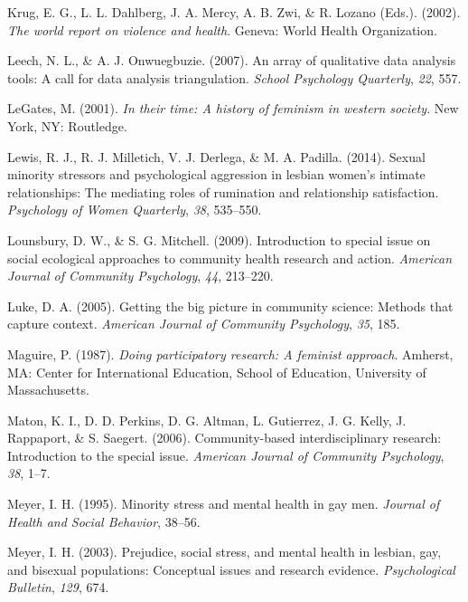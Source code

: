 \documentclass[11pt,]{tufte-book}
\begin{document}
\hypertarget{ref-krug2002world}{}
Krug, E. G., L. L. Dahlberg, J. A. Mercy, A. B. Zwi, \& R. Lozano
(Eds.). (2002). \emph{The world report on violence and health}. Geneva:
World Health Organization.

\hypertarget{ref-leech2007array}{}
Leech, N. L., \& A. J. Onwuegbuzie. (2007). An array of qualitative data
analysis tools: A call for data analysis triangulation. \emph{School
Psychology Quarterly}, \emph{22}, 557.

\hypertarget{ref-legates2001their}{}
LeGates, M. (2001). \emph{In their time: A history of feminism in
western society}. New York, NY: Routledge.

\hypertarget{ref-lewis2014sexual}{}
Lewis, R. J., R. J. Milletich, V. J. Derlega, \& M. A. Padilla. (2014).
Sexual minority stressors and psychological aggression in lesbian
women's intimate relationships: The mediating roles of rumination and
relationship satisfaction. \emph{Psychology of Women Quarterly},
\emph{38}, 535--550.

\hypertarget{ref-lounsbury2009introduction}{}
Lounsbury, D. W., \& S. G. Mitchell. (2009). Introduction to special
issue on social ecological approaches to community health research and
action. \emph{American Journal of Community Psychology}, \emph{44},
213--220.

\hypertarget{ref-luke2005getting}{}
Luke, D. A. (2005). Getting the big picture in community science:
Methods that capture context. \emph{American Journal of Community
Psychology}, \emph{35}, 185.

\hypertarget{ref-maguire1987doing}{}
Maguire, P. (1987). \emph{Doing participatory research: A feminist
approach}. Amherst, MA: Center for International Education, School of
Education, University of Massachusetts.

\hypertarget{ref-maton2006community}{}
Maton, K. I., D. D. Perkins, D. G. Altman, L. Gutierrez, J. G. Kelly, J.
Rappaport, \& S. Saegert. (2006). Community-based interdisciplinary
research: Introduction to the special issue. \emph{American Journal of
Community Psychology}, \emph{38}, 1--7.

\hypertarget{ref-meyer1995minority}{}
Meyer, I. H. (1995). Minority stress and mental health in gay men.
\emph{Journal of Health and Social Behavior}, 38--56.

\hypertarget{ref-meyer2003prejudice}{}
Meyer, I. H. (2003). Prejudice, social stress, and mental health in
lesbian, gay, and bisexual populations: Conceptual issues and research
evidence. \emph{Psychological Bulletin}, \emph{129}, 674.
\end{document}
